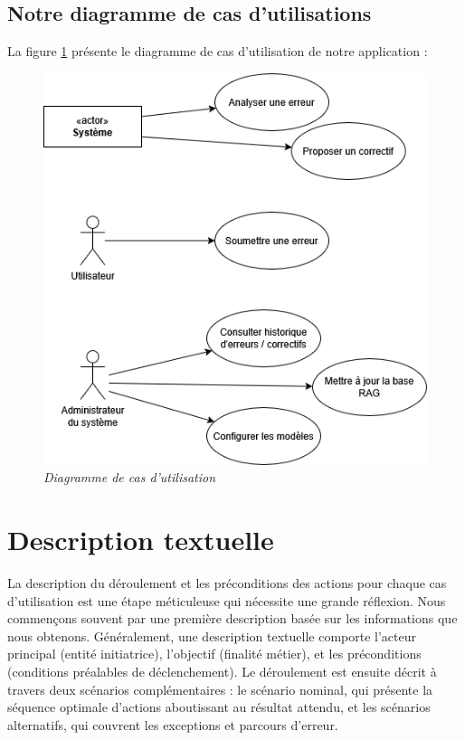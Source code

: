 \documentclass[12pt,a4paper]{report}
\begin{document}
	\subsection{Notre diagramme de cas d'utilisations}
	
	La figure \ref{fig:use-case} présente le diagramme de cas d'utilisation de notre application :
	
	\begin{figure}[H]
		\centering
		\includegraphics{use-case.drawio.png}
		\caption{\textit{Diagramme de cas d'utilisation}}
		\label{fig:use-case}
	\end{figure}
	
	\section{Description textuelle}
	
	La description du déroulement et les préconditions des actions pour chaque cas d'utilisation est une étape méticuleuse qui nécessite une grande réflexion. Nous commençons souvent par une première description basée sur les informations que nous obtenons.
	Généralement, une description textuelle comporte l'acteur principal (entité initiatrice), l'objectif (finalité métier), et les préconditions (conditions préalables de déclenchement). Le déroulement est ensuite décrit à travers deux scénarios complémentaires : le scénario nominal, qui présente la séquence optimale d'actions aboutissant au résultat attendu, et les scénarios alternatifs, qui couvrent les exceptions et parcours d'erreur.
	
\end{document}
